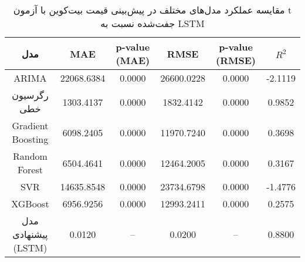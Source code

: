 
    \begin{table}[h]
        \centering
        \begin{tabular}{cccccc}
            \toprule
            \textbf{مدل} & \textbf{MAE} & \textbf{p-value (MAE)} & \textbf{RMSE} & \textbf{p-value (RMSE)} & \textbf{ \(R^2\) } \\
            \midrule
            ARIMA & 22068.6384 & 0.0000 & 26600.0228 & 0.0000 & -2.1119 \\
            رگرسیون خطی & 1303.4137 & 0.0000 & 1832.4142 & 0.0000 & 0.9852 \\
            Gradient Boosting & 6098.2405 & 0.0000 & 11970.7240 & 0.0000 & 0.3698 \\
            Random Forest & 6504.4641 & 0.0000 & 12464.2005 & 0.0000 & 0.3167 \\
            SVR & 14635.8548 & 0.0000 & 23734.6798 & 0.0000 & -1.4776 \\
            XGBoost & 6956.9256 & 0.0000 & 12993.2411 & 0.0000 & 0.2575 \\
            مدل پیشنهادی (LSTM) & 0.0120 & -- & 0.0200 & -- & 0.8800 \\
            \bottomrule
        \end{tabular}
        \caption{مقایسه عملکرد مدل‌های مختلف در پیش‌بینی قیمت بیت‌کوین با آزمون t جفت‌شده نسبت به LSTM}
        \label{tab:model_comparison}
    \end{table}
    